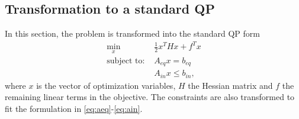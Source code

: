 \documentclass[letterpaper,10pt,conference]{ieeeconf}
\begin{document}
\subsection{Transformation to a standard QP}
In this section, the problem is transformed into the standard QP form
\begin{subequations} \label{stform}
\begin{align}\label{eq:quad}
\min_{x}\; &\frac{1}{2}x^THx+f^Tx\\
\text{subject to: }
&A_{eq}x =b_{eq}\label{eq:aeq}\\
&A_{in}x \leq b_{in},\label{eq:ain}
\end{align}
\end{subequations}
where $x$ is the vector of optimization variables, $H$ the Hessian matrix and $f$ the remaining linear terms in the objective. The constraints are also transformed to fit the formulation in \eqref{eq:aeq}-\eqref{eq:ain}.
\end{document}
